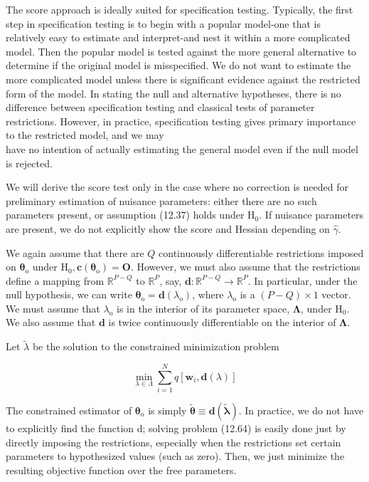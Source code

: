 \documentclass[10pt]{article}
\begin{document}
The score approach is ideally suited for specification testing. Typically, the first step in specification testing is to begin with a popular model-one that is relatively easy to estimate and interpret-and nest it within a more complicated model. Then the popular model is tested against the more general alternative to determine if the original model is misspecified. We do not want to estimate the more complicated model unless there is significant evidence against the restricted form of the model. In stating the null and alternative hypotheses, there is no difference between specification testing and classical tests of parameter restrictions. However, in practice, specification testing gives primary importance to the restricted model, and we may\\
have no intention of actually estimating the general model even if the null model is rejected.

We will derive the score test only in the case where no correction is needed for preliminary estimation of nuisance parameters: either there are no such parameters present, or assumption (12.37) holds under $\mathrm{H}_{0}$. If nuisance parameters are present, we do not explicitly show the score and Hessian depending on $\hat{\gamma}$.

We again assume that there are $Q$ continuously differentiable restrictions imposed on $\boldsymbol{\theta}_{\mathrm{o}}$ under $\mathrm{H}_{0}, \mathbf{c}\left(\boldsymbol{\theta}_{\mathrm{o}}\right)=\mathbf{O}$. However, we must also assume that the restrictions define a mapping from $\mathbb{R}^{P-Q}$ to $\mathbb{R}^{P}$, say, $\mathbf{d}: \mathbb{R}^{P-Q} \rightarrow \mathbb{R}^{P}$. In particular, under the null hypothesis, we can write $\boldsymbol{\theta}_{\mathrm{o}}=\mathbf{d}\left(\lambda_{\mathrm{o}}\right)$, where $\lambda_{\mathrm{o}}$ is a $(P-Q) \times 1$ vector. We must assume that $\lambda_{\mathrm{o}}$ is in the interior of its parameter space, $\boldsymbol{\Lambda}$, under $\mathrm{H}_{0}$. We also assume that $\mathbf{d}$ is twice continuously differentiable on the interior of $\boldsymbol{\Lambda}$.

Let $\tilde{\lambda}$ be the solution to the constrained minimization problem


\begin{equation*}
\min _{\lambda \in \Lambda} \sum_{i=1}^{N} q\left[\mathbf{w}_{i}, \mathbf{d}(\lambda)\right] \tag{12.64}
\end{equation*}


The constrained estimator of $\boldsymbol{\theta}_{\mathrm{o}}$ is simply $\tilde{\boldsymbol{\theta}} \equiv \mathbf{d}(\tilde{\boldsymbol{\lambda}})$. In practice, we do not have to explicitly find the function d; solving problem (12.64) is easily done just by directly imposing the restrictions, especially when the restrictions set certain parameters to hypothesized values (such as zero). Then, we just minimize the resulting objective function over the free parameters.
\end{document}
